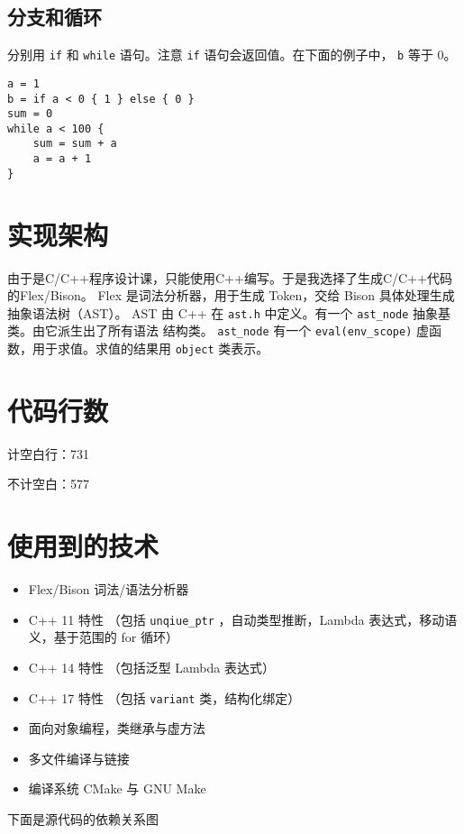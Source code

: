 \documentclass[UTF8]{ctexart}
\begin{document}
\subsection{分支和循环}
\label{sec:orgb6267ee}
分别用 \texttt{if} 和 \texttt{while} 语句。注意 \texttt{if} 语句会返回值。在下面的例子中， \texttt{b} 等于 0。
\begin{verbatim}
a = 1
b = if a < 0 { 1 } else { 0 }
sum = 0
while a < 100 {
    sum = sum + a
    a = a + 1
}
\end{verbatim}

\section{实现架构}
\label{sec:org0cb82d6}

由于是C/C++程序设计课，只能使用C++编写。于是我选择了生成C/C++代码的Flex/Bison。
Flex 是词法分析器，用于生成 Token，交给 Bison 具体处理生成抽象语法树（AST）。
AST 由 C++ 在 \texttt{ast.h} 中定义。有一个 \texttt{ast\_node} 抽象基类。由它派生出了所有语法
结构类。 \texttt{ast\_node} 有一个 \texttt{eval(env\_scope)} 虚函数，用于求值。求值的结果用
\texttt{object} 类表示。

\section{代码行数}
\label{sec:org5252de5}

计空白行：731

不计空白：577

\section{使用到的技术}
\label{sec:org0c661ba}

\begin{itemize}
\item Flex/Bison 词法/语法分析器
\item C++ 11 特性 （包括 \texttt{unqiue\_ptr} ，自动类型推断，Lambda 表达式，移动语义，基于范围的 for 循环）
\item C++ 14 特性 （包括泛型 Lambda 表达式）
\item C++ 17 特性 （包括 \texttt{variant} 类，结构化绑定）
\item 面向对象编程，类继承与虚方法
\item 多文件编译与链接
\item 编译系统 CMake 与 GNU Make
\end{itemize}

下面是源代码的依赖关系图
 \begin{center}

\end{center} 
\end{document}
